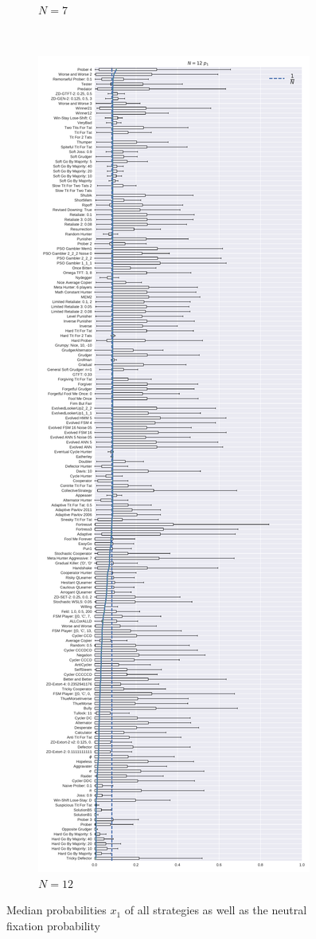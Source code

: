 \documentclass{article}
\begin{document}
\begin{figure}[!hbtp]
\begin{subfigure}[t]{.3\textwidth}
        \caption{\(N=7\)}
    \end{subfigure}%
    ~
    \begin{subfigure}[t]{.3\textwidth}
        \centering
        \includegraphics[width=\textwidth]{./img/boxplot_12_invade.pdf}
        \caption{\(N=12\)}
    \end{subfigure}%

    \caption{Median probabilities \(x_{1}\) of all strategies as well as the
    neutral fixation probability}
    \label{fig:fixation_boxplot_invade}
\end{figure}
\end{document}
